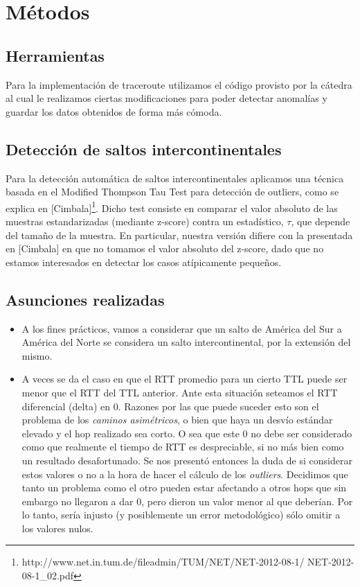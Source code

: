 \section{Métodos}

\subsection*{Herramientas}
Para la implementación de traceroute utilizamos el código provisto por la cátedra al cual le realizamos ciertas modificaciones para poder detectar anomalías y guardar los datos obtenidos de forma más cómoda.

\subsection*{Detección de saltos intercontinentales}

Para la detección automática de saltos intercontinentales aplicamos una técnica basada en el Modified Thompson Tau Test para detección de outliers, como se explica en [Cimbala]\footnote{http://www.net.in.tum.de/fileadmin/TUM/NET/NET-2012-08-1/
NET-2012-08-1\_02.pdf}. Dicho test consiste en comparar el valor absoluto de las muestras estandarizadas (mediante z-score) contra un estadístico, $\tau$, que depende del tamaño de la muestra. En particular, nuestra versión difiere con la presentada en [Cimbala] en que no tomamos el valor absoluto del z-score, dado que no estamos interesados en detectar los casos atípicamente pequeños. 

\subsection*{Asunciones realizadas}
\begin{itemize}
	\item A los fines prácticos, vamos a considerar que un salto de América del Sur a América del Norte se considera un salto intercontinental, por la extensión del mismo.
	\item A veces se da el caso en que el RTT promedio para un cierto TTL puede ser menor que el RTT del TTL anterior. Ante esta situación seteamos el RTT diferencial (delta) en 0. Razones por las que puede suceder esto son el problema de los \emph{caminos asimétricos}, o bien que haya un desvío estándar elevado y el hop realizado sea corto. O sea que este 0 no debe ser considerado como que realmente el tiempo de RTT es despreciable, si no más bien como un resultado desafortunado. Se nos presentó entonces la duda de si considerar estos valores o no a la hora de hacer el cálculo de los \emph{outliers}. Decidimos que tanto un problema como el otro pueden estar afectando a otros hops que sin embargo no llegaron a dar 0, pero dieron un valor menor al que deberían. Por lo tanto, sería injusto (y posiblemente un error metodológico) sólo omitir a los valores nulos.
\end{itemize}


